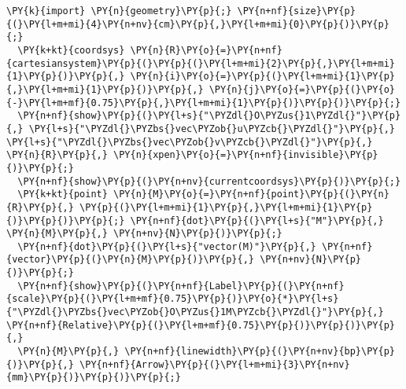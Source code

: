 \begin{Verbatim}[commandchars=\\\{\}]
  \PY{k}{import} \PY{n}{geometry}\PY{p}{;} \PY{n+nf}{size}\PY{p}{(}\PY{l+m+mi}{4}\PY{n+nv}{cm}\PY{p}{,}\PY{l+m+mi}{0}\PY{p}{)}\PY{p}{;}
  \PY{k+kt}{coordsys} \PY{n}{R}\PY{o}{=}\PY{n+nf}{cartesiansystem}\PY{p}{(}\PY{p}{(}\PY{l+m+mi}{2}\PY{p}{,}\PY{l+m+mi}{1}\PY{p}{)}\PY{p}{,} \PY{n}{i}\PY{o}{=}\PY{p}{(}\PY{l+m+mi}{1}\PY{p}{,}\PY{l+m+mi}{1}\PY{p}{)}\PY{p}{,} \PY{n}{j}\PY{o}{=}\PY{p}{(}\PY{o}{-}\PY{l+m+mf}{0.75}\PY{p}{,}\PY{l+m+mi}{1}\PY{p}{)}\PY{p}{)}\PY{p}{;}
  \PY{n+nf}{show}\PY{p}{(}\PY{l+s}{"\PYZdl{}O\PYZus{}1\PYZdl{}"}\PY{p}{,} \PY{l+s}{"\PYZdl{}\PYZbs{}vec\PYZob{}u\PYZcb{}\PYZdl{}"}\PY{p}{,} \PY{l+s}{"\PYZdl{}\PYZbs{}vec\PYZob{}v\PYZcb{}\PYZdl{}"}\PY{p}{,} \PY{n}{R}\PY{p}{,} \PY{n}{xpen}\PY{o}{=}\PY{n+nf}{invisible}\PY{p}{)}\PY{p}{;}
  \PY{n+nf}{show}\PY{p}{(}\PY{n+nv}{currentcoordsys}\PY{p}{)}\PY{p}{;}
  \PY{k+kt}{point} \PY{n}{M}\PY{o}{=}\PY{n+nf}{point}\PY{p}{(}\PY{n}{R}\PY{p}{,} \PY{p}{(}\PY{l+m+mi}{1}\PY{p}{,}\PY{l+m+mi}{1}\PY{p}{)}\PY{p}{)}\PY{p}{;} \PY{n+nf}{dot}\PY{p}{(}\PY{l+s}{"M"}\PY{p}{,} \PY{n}{M}\PY{p}{,} \PY{n+nv}{N}\PY{p}{)}\PY{p}{;}
  \PY{n+nf}{dot}\PY{p}{(}\PY{l+s}{"vector(M)"}\PY{p}{,} \PY{n+nf}{vector}\PY{p}{(}\PY{n}{M}\PY{p}{)}\PY{p}{,} \PY{n+nv}{N}\PY{p}{)}\PY{p}{;}
  \PY{n+nf}{show}\PY{p}{(}\PY{n+nf}{Label}\PY{p}{(}\PY{n+nf}{scale}\PY{p}{(}\PY{l+m+mf}{0.75}\PY{p}{)}\PY{o}{*}\PY{l+s}{"\PYZdl{}\PYZbs{}vec\PYZob{}O\PYZus{}1M\PYZcb{}\PYZdl{}"}\PY{p}{,} \PY{n+nf}{Relative}\PY{p}{(}\PY{l+m+mf}{0.75}\PY{p}{)}\PY{p}{)}\PY{p}{,}
  \PY{n}{M}\PY{p}{,} \PY{n+nf}{linewidth}\PY{p}{(}\PY{n+nv}{bp}\PY{p}{)}\PY{p}{,} \PY{n+nf}{Arrow}\PY{p}{(}\PY{l+m+mi}{3}\PY{n+nv}{mm}\PY{p}{)}\PY{p}{)}\PY{p}{;}
\end{Verbatim}
